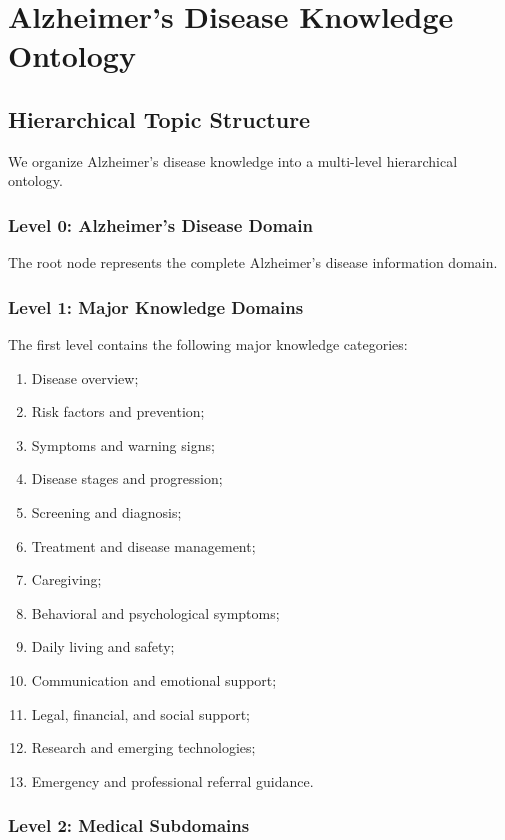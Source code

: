 \documentclass{article}
\begin{document}
\section{Alzheimer's Disease Knowledge Ontology}

\subsection{Hierarchical Topic Structure}

We organize Alzheimer's disease knowledge into a multi-level hierarchical 
ontology.

\subsubsection{Level 0: Alzheimer's Disease Domain}

The root node represents the complete Alzheimer's disease information domain.

\subsubsection{Level 1: Major Knowledge Domains}

The first level contains the following major knowledge categories:

\begin{enumerate}
    \item Disease overview;
    \item Risk factors and prevention;
    \item Symptoms and warning signs;
    \item Disease stages and progression;
    \item Screening and diagnosis;
    \item Treatment and disease management;
    \item Caregiving;
    \item Behavioral and psychological symptoms;
    \item Daily living and safety;
    \item Communication and emotional support;
    \item Legal, financial, and social support;
    \item Research and emerging technologies;
    \item Emergency and professional referral guidance.
\end{enumerate}

\subsubsection{Level 2: Medical Subdomains}
\end{document}

